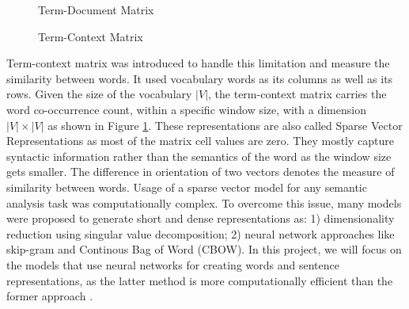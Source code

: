 \documentclass[12pt]{report} %
\begin{document}
\begin{figure}[!tbp]
	\centering
	\begin{minipage}[b]{0.57\textwidth}
		\centering
		\caption{ Term-Document Matrix}
		\label{doc-word}
	\end{minipage}
	\begin{minipage}[b]{0.57\textwidth}
		\centering
		\caption{Term-Context Matrix}
		\label{word-word}
	\end{minipage}
\end{figure}

Term-context matrix was introduced to handle this limitation and measure the similarity between words.  It used vocabulary words as its columns as well as its rows. Given the size of the vocabulary $|V|$, the term-context matrix carries the word co-occurrence count, within a specific window size,  with a dimension $|V| \times |V|$ as shown in Figure \ref{word-word}. These representations are also called Sparse Vector Representations as most of the matrix cell values are zero. They mostly capture syntactic information rather than the semantics of the word as the window size gets smaller. The difference in orientation of two vectors denotes the measure of similarity between words. Usage of a sparse vector model for any semantic analysis task was computationally complex. To overcome this issue, many models were proposed to generate short and dense representations as: 1) dimensionality reduction using singular value decomposition; 2) neural network approaches like skip-gram and Continous Bag of Word (CBOW). In this project, we will focus on the models that use neural networks for creating words and sentence representations, as the latter method is more computationally efficient than the former approach \citep{jurafsky2014speech}.
\end{document}
